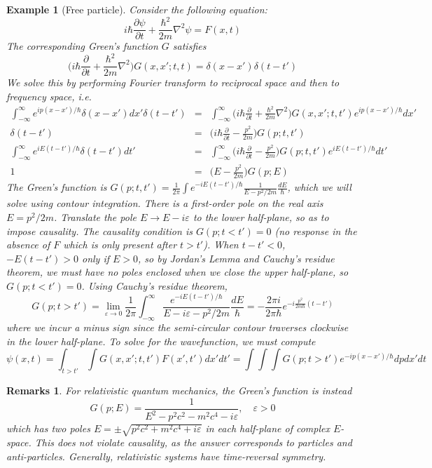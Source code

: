 \documentclass[a4paper]{article}
\newtheorem{remarks}{Remarks}[section]
\newtheorem{eg}{Example}[section]
\theoremstyle{new}
\begin{document}
\begin{eg}[Free particle]
Consider the following equation:
$$i\hbar\frac{\partial\psi}{\partial t}+\frac{\hbar^2}{2m}\nabla^2\psi=F(x,t)$$
The corresponding Green's function $G$ satisfies
$$\bigg(i\hbar\frac{\partial}{\partial t}+\frac{\hbar^2}{2m}\nabla^2\bigg)G(x,x';t,t)=\delta(x-x')\delta(t-t')$$
We solve this by performing Fourier transform to reciprocal space and then to frequency space, i.e.
\begin{eqnarray}
\int_{-\infty}^\infty e^{ip(x-x')/\hbar}\delta(x-x')dx'\delta(t-t')&=&\int_{-\infty}^\infty\bigg(i\hbar\frac{\partial}{\partial t}+\frac{\hbar^2}{2m}\nabla^2\bigg)G(x,x';t,t')e^{ip(x-x')/\hbar}dx'\nonumber\\\delta(t-t')&=&\bigg(i\hbar\frac{\partial}{\partial t}-\frac{p^2}{2m}\bigg)G(p;t,t')\nonumber\\\int_{-\infty}^\infty e^{iE(t-t')/\hbar}\delta(t-t')dt'&=&\int_{-\infty}^\infty\bigg(i\hbar\frac{\partial}{\partial t}-\frac{p^2}{2m}\bigg)G(p;t,t')e^{iE(t-t')/\hbar}dt'\nonumber\\1&=&\bigg(E-\frac{p^2}{2m}\bigg)G(p;E)\nonumber
\end{eqnarray}
The Green's function is $G(p;t,t')=\frac{1}{2\pi}\int e^{-iE(t-t')/\hbar}\frac{1}{E-p^2/2m}\frac{dE}{\hbar}$, which we will solve using contour integration. There is a first-order pole on the real axis $E=p^2/2m$. Translate the pole $E\rightarrow E-i\varepsilon$ to the lower half-plane, so as to impose causality. The causality condition is $G(p;t<t')=0$ (no response in the absence of $F$ which is only present after $t>t'$). When $t-t'<0$, $-E(t-t')>0$ only if $E>0$, so by Jordan's Lemma and Cauchy's residue theorem, we must have no poles enclosed when we close the upper half-plane, so $G(p;t<t')=0$. Using Cauchy's residue theorem,
$$G(p;t>t')=\lim_{\varepsilon\rightarrow 0}\frac{1}{2\pi}\int_{-\infty}^\infty\frac{e^{-iE(t-t')/\hbar}}{E-i\varepsilon-p^2/2m}\frac{dE}{\hbar}=-\frac{2\pi i}{2\pi\hbar}e^{-i\frac{p^2}{2m\hbar}(t-t')}$$
where we incur a minus sign since the semi-circular contour traverses clockwise in the lower half-plane. To solve for the wavefunction, we must compute
$$\psi(x,t)=\int_{t>t'}\int G(x,x';t,t')F(x',t')dx'dt'=\int\int\int G(p;t>t')e^{-ip(x-x')/\hbar}dpdx'dt$$
\end{eg}
\begin{remarks}
For relativistic quantum mechanics, the Green's function is instead
$$G(p;E)=\frac{1}{E^2-p^2c^2-m^2c^4-i\varepsilon},\quad\varepsilon>0$$
which has two poles $E=\pm\sqrt{p^2c^2+m^2c^4+i\varepsilon}$ in each half-plane of complex $E$-space. This does not violate causality, as the answer corresponds to particles and anti-particles. Generally, relativistic systems have time-reversal symmetry.
\end{remarks}
\end{document}
